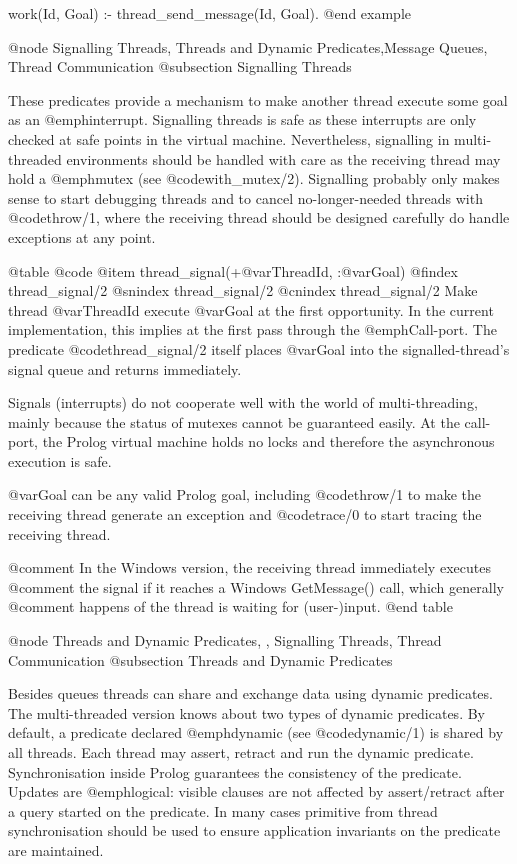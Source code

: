 {{{{{{{{%
%	

work(Id, Goal) :-
	thread_send_message(Id, Goal).
@end example

@node Signalling Threads, Threads and Dynamic Predicates,Message Queues, Thread Communication
@subsection Signalling Threads

These predicates provide a mechanism to make another thread execute some
goal as an @emph{interrupt}.  Signalling threads is safe as these
interrupts are only checked at safe points in the virtual machine.
Nevertheless, signalling in multi-threaded environments should be
handled with care as the receiving thread may hold a @emph{mutex}
(see @code{with_mutex/2}).  Signalling probably only makes sense to start
debugging threads and to cancel no-longer-needed threads with @code{throw/1},
where the receiving thread should be designed carefully do handle
exceptions at any point.

@table @code
@item thread_signal(+@var{ThreadId}, :@var{Goal})
@findex thread_signal/2
@snindex thread_signal/2
@cnindex thread_signal/2
Make thread @var{ThreadId} execute @var{Goal} at the first
opportunity.  In the current implementation, this implies at the first
pass through the @emph{Call-port}. The predicate @code{thread_signal/2}
itself places @var{Goal} into the signalled-thread's signal queue
and returns immediately.

Signals (interrupts) do not cooperate well with the world of
multi-threading, mainly because the status of mutexes cannot be
guaranteed easily.  At the call-port, the Prolog virtual machine
holds no locks and therefore the asynchronous execution is safe.

@var{Goal} can be any valid Prolog goal, including @code{throw/1} to make
the receiving thread generate an exception and @code{trace/0} to start
tracing the receiving thread.

@comment In the Windows version, the receiving thread immediately executes
@comment the signal if it reaches a Windows GetMessage() call, which generally
@comment happens of the thread is waiting for (user-)input.
@end table

@node Threads and Dynamic Predicates, , Signalling Threads, Thread Communication
@subsection Threads and Dynamic Predicates

Besides queues threads can share and exchange data using dynamic
predicates. The multi-threaded version knows about two types of
dynamic predicates. By default, a predicate declared @emph{dynamic}
(see @code{dynamic/1}) is shared by all threads. Each thread may
assert, retract and run the dynamic predicate. Synchronisation inside
Prolog guarantees the consistency of the predicate. Updates are
@emph{logical}: visible clauses are not affected by assert/retract
after a query started on the predicate. In many cases primitive from
thread synchronisation should be used to ensure application invariants on
the predicate are maintained.

}}}}}}}}
